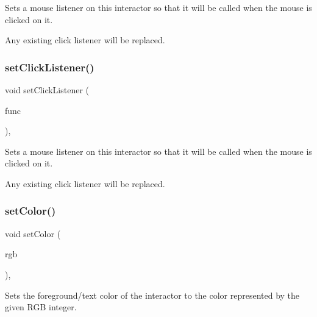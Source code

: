Sets a mouse listener on this interactor so that it will be called when the mouse is clicked on it. 

Any existing click listener will be replaced. \mbox{\label{classsgl_1_1GInteractor_a856414c92df90f56f3877475eb3f8fc4}} 
\subsubsection{\texorpdfstring{set\+Click\+Listener()}{setClickListener()}\hspace{0.1cm}{\footnotesize\ttfamily [2/2]}}
{\footnotesize\ttfamily void set\+Click\+Listener (\begin{DoxyParamCaption}\item[{\mbox{\hyperlink{namespacesgl_a54427ce97bb1c2804e4fe2b0a62e8b17}{G\+Event\+Listener\+Void}}}]{func }\end{DoxyParamCaption})\hspace{0.3cm}{\ttfamily [virtual]}, {\ttfamily [inherited]}}



Sets a mouse listener on this interactor so that it will be called when the mouse is clicked on it. 

Any existing click listener will be replaced. \mbox{\label{classsgl_1_1GInteractor_ab1f5cc0f5cc6bbbd716a526c61f1081d}} 
\subsubsection{\texorpdfstring{set\+Color()}{setColor()}\hspace{0.1cm}{\footnotesize\ttfamily [1/2]}}
{\footnotesize\ttfamily void set\+Color (\begin{DoxyParamCaption}\item[{int}]{rgb }\end{DoxyParamCaption})\hspace{0.3cm}{\ttfamily [virtual]}, {\ttfamily [inherited]}}



Sets the foreground/text color of the interactor to the color represented by the given R\+GB integer. 


